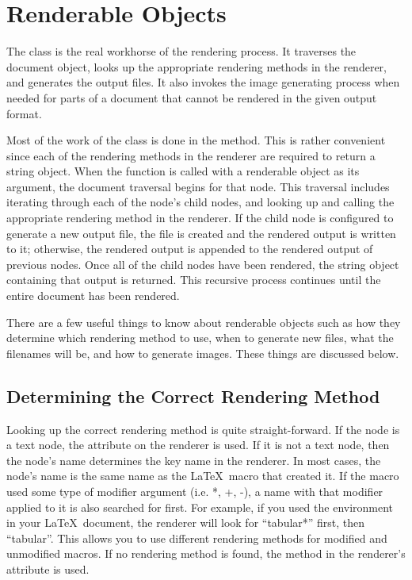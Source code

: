 \section{Renderable Objects\label{sec:renderable}}

The  class is the real workhorse of the rendering process.
It traverses the document object, looks up the appropriate rendering
methods in the renderer, and generates the output files.  It also
invokes the image generating process when needed for parts of a document
that cannot be rendered in the given output format.

Most of the work of the  class is done in the
 method.  This is rather convenient since each of
the rendering methods in the renderer are required to return a string
object.  When the  function is called with a renderable
object as its argument, the document traversal begins for that node.
This traversal includes iterating through each of the node's child nodes, and
looking up and calling the appropriate rendering method in the renderer.
If the child node is configured to generate a new output file, the
file is created and the rendered output is written to it; otherwise,
the rendered output is appended to the rendered output of previous nodes.
Once all of the child nodes have been rendered, the string object containing
that output is returned.  This recursive process continues until the
entire document has been rendered.

There are a few useful things to know about renderable objects such as
how they determine which rendering method to use, when to generate new
files, what the filenames will be, and how to generate images.  These
things are discussed below.


\subsection{Determining the Correct Rendering Method}

Looking up the correct rendering method is quite straight-forward.
If the node is a text node, the  attribute on
the renderer is used.  If it is not a text node, then the node's name
determines the key name in the renderer.  In most cases, the node's
name is the same name as the \LaTeX\ macro that created it.  If the
macro used some type of modifier argument (i.e. *, +, -), a name
with that modifier applied to it is also searched for first.  For example,
if you used the  environment in your \LaTeX\
document, the renderer will look for ``tabular*'' first, then ``tabular''.
This allows you to use different rendering methods for modified and
unmodified macros.  If no rendering method is found, the method
in the renderer's  attribute is used.


